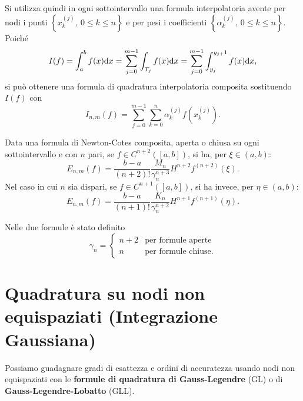 Si utilizza quindi in ogni sottointervallo una formula interpolatoria avente per nodi i punti $\left\{x^{(j)}_{k} ,\ 0\leqslant k\leqslant n\right\}$ e per pesi i coefficienti $\left\{\alpha ^{(j)}_{k} ,\ 0\leqslant k\leqslant n\right\}$. Poiché
\begin{equation*}
I(f) =\int ^{b}_{a} f(x) \mathrm d x=\sum\limits ^{m-1}_{j=0}\int\nolimits _{T_{j}} f(x) \mathrm d x=\sum\limits ^{m-1}_{j=0}\int\nolimits ^{y_{j+} 1}_{y_{j}} f(x) \mathrm d x,
\end{equation*}
si può ottenere una formula di quadratura interpolatoria composita sostituendo $I(f)$ con
\begin{equation*}
I_{n,m}(f) =\sum\limits ^{m-1}_{j=0}\sum\limits ^{n}_{k=0} \alpha ^{(j)}_{k} f\left( x^{(j)}_{k}\right).
\end{equation*}
\begin{theorem}
Data una formula di Newton-Cotes composita, aperta o chiusa su ogni sottointervallo e con $n$ pari, se $f\in C^{n+2}([ a,b])$, si ha, per $\xi \in ( a,b)$:
\begin{equation*}
E_{n,m}(f) =\frac{b-a}{( n+2) !}\frac{M_{n}}{\gamma ^{n+3}_{n}} H^{n+2} f^{( n+2)}( \xi ).
\end{equation*}
Nel caso in cui $n$ sia dispari, se $f\in C^{n+1}([ a,b])$, si ha invece, per $\eta \in ( a,b)$:
\begin{equation*}
E_{n,m}(f) =\frac{b-a}{( n+1) !}\frac{K_{n}}{\gamma ^{n+2}_{n}} H^{n+1} f^{( n+1)}( \eta ).
\end{equation*}

Nelle due formule è stato definito
\begin{equation*}
\gamma _{n} =\begin{cases}
n+2 & \text{per formule aperte}\\
n & \text{per formule chiuse}.
\end{cases}
\end{equation*}
\end{theorem}

\section{Quadratura su nodi non equispaziati (Integrazione Gaussiana)}
\label{sec:integrazione-gaussiana}

Possiamo guadagnare gradi di esattezza e ordini di accuratezza usando nodi non equispaziati con le \textbf{formule di quadratura di Gauss-Legendre} (GL) o di \textbf{Gauss-Legendre-Lobatto} (GLL).

